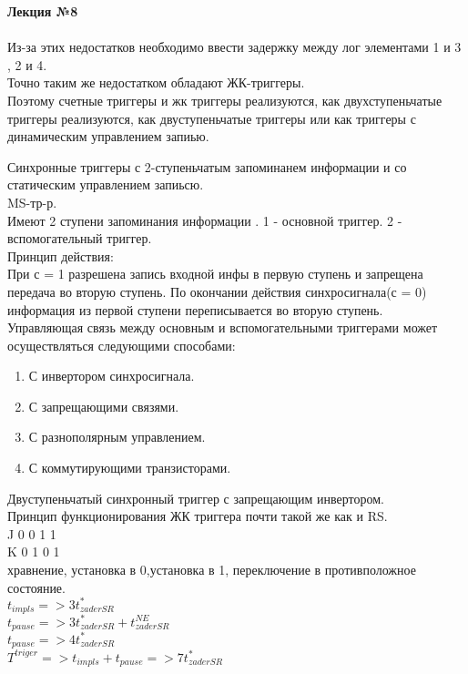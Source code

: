 

\LARGE{ \textbf {Лекция №8}}\\
\Large{ \textbf {}}\\

Из-за этих недостатков необходимо ввести задержку между лог элементами 1 и 3 , 2 и 4. \\
Точно таким же недостатком обладают ЖК-триггеры. \\
Поэтому счетные триггеры и жк триггеры реализуются, как двухступеньчатые триггеры реализуются, как двуступеньчатые триггеры или
как триггеры с динамическим управлением запиью.


\Large{Синхронные триггеры с 2-ступеньчатым запоминанем информации и со статическим управлением запиьсю.}\\
MS-тр-р.\\
Имеют 2 ступени запоминания информации . 1 - основной триггер. 2 - вспомогательный триггер.\\
Принцип действия:\\
При с = 1 разрешена запись входной инфы в первую ступень и запрещена передача во вторую ступень.
По окончании действия синхросигнала(с = 0) информация из первой ступени переписывается во вторую ступень.\\
Управляющая связь между основным и вспомогательными триггерами может осуществляться следующими способами:

\begin{enumerate}
  \item С инвертором синхросигнала.
  \item С запрещающими связями.
  \item С разнополярным управлением.
  \item С коммутирующими транзисторами.
\end{enumerate}

\Large{Двуступеньчатый синхронный триггер с запрещающим инвертором. }\\


Принцип функционирования ЖК триггера почти такой же как и RS.\\
J 0 0 1 1 \\
K 0 1 0 1 \\
хравнение, установка в 0,установка в 1, переключение в противположное состояние. \\
$t_{impls} => 3t^*_{zaderSR}$\\
$t_{pause} => 3t^*_{zaderSR} + t^{NE}_{zaderSR} $\\
$t_{pause} => 4t^*_{zaderSR} $\\
$T^{triger}=>t_{impls} + t_{pause}  => 7 t^*_{zaderSR}$ \\


